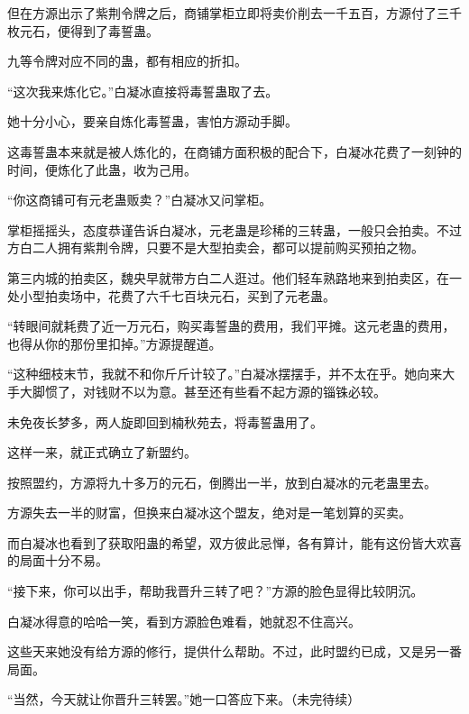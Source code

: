 \begin{this_body}
但在方源出示了紫荆令牌之后，商铺掌柜立即将卖价削去一千五百，方源付了三千枚元石，便得到了毒誓蛊。

九等令牌对应不同的蛊，都有相应的折扣。

“这次我来炼化它。”白凝冰直接将毒誓蛊取了去。

她十分小心，要亲自炼化毒誓蛊，害怕方源动手脚。

这毒誓蛊本来就是被人炼化的，在商铺方面积极的配合下，白凝冰花费了一刻钟的时间，便炼化了此蛊，收为己用。

“你这商铺可有元老蛊贩卖？”白凝冰又问掌柜。

掌柜摇摇头，态度恭谨告诉白凝冰，元老蛊是珍稀的三转蛊，一般只会拍卖。不过方白二人拥有紫荆令牌，只要不是大型拍卖会，都可以提前购买预拍之物。

第三内城的拍卖区，魏央早就带方白二人逛过。他们轻车熟路地来到拍卖区，在一处小型拍卖场中，花费了六千七百块元石，买到了元老蛊。

“转眼间就耗费了近一万元石，购买毒誓蛊的费用，我们平摊。这元老蛊的费用，也得从你的那份里扣掉。”方源提醒道。

“这种细枝末节，我就不和你斤斤计较了。”白凝冰摆摆手，并不太在乎。她向来大手大脚惯了，对钱财不以为意。甚至还有些看不起方源的锱铢必较。

未免夜长梦多，两人旋即回到楠秋苑去，将毒誓蛊用了。

这样一来，就正式确立了新盟约。

按照盟约，方源将九十多万的元石，倒腾出一半，放到白凝冰的元老蛊里去。

方源失去一半的财富，但换来白凝冰这个盟友，绝对是一笔划算的买卖。

而白凝冰也看到了获取阳蛊的希望，双方彼此忌惮，各有算计，能有这份皆大欢喜的局面十分不易。

“接下来，你可以出手，帮助我晋升三转了吧？”方源的脸色显得比较阴沉。

白凝冰得意的哈哈一笑，看到方源脸色难看，她就忍不住高兴。

这些天来她没有给方源的修行，提供什么帮助。不过，此时盟约已成，又是另一番局面。

“当然，今天就让你晋升三转罢。”她一口答应下来。（未完待续）

\end{this_body}

